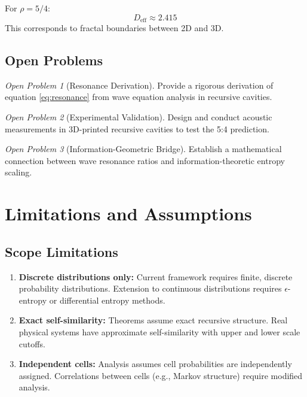 \documentclass[11pt,a4paper]{article}
\theoremstyle{definition}
\theoremstyle{remark}
\newtheorem{openproblem}{Open Problem}
\newcommand{\Deff}{D_{\mathrm{eff}}}
\begin{document}
For $\rho = 5/4$:
\begin{equation}
    \Deff \approx 2.415
\end{equation}
This corresponds to fractal boundaries between 2D and 3D.

\subsection{Open Problems}

\begin{openproblem}[Resonance Derivation]
Provide a rigorous derivation of equation \eqref{eq:resonance} from wave equation analysis in recursive cavities.
\end{openproblem}

\begin{openproblem}[Experimental Validation]
Design and conduct acoustic measurements in 3D-printed recursive cavities to test the 5:4 prediction.
\end{openproblem}

\begin{openproblem}[Information-Geometric Bridge]
Establish a mathematical connection between wave resonance ratios and information-theoretic entropy scaling.
\end{openproblem}

\section{Limitations and Assumptions}
\label{sec:limitations}

\subsection{Scope Limitations}

\begin{enumerate}
    \item \textbf{Discrete distributions only:} Current framework requires finite, discrete probability distributions. Extension to continuous distributions requires $\epsilon$-entropy or differential entropy methods.
    
    \item \textbf{Exact self-similarity:} Theorems assume exact recursive structure. Real physical systems have approximate self-similarity with upper and lower scale cutoffs.
    
    \item \textbf{Independent cells:} Analysis assumes cell probabilities are independently assigned. Correlations between cells (e.g., Markov structure) require modified analysis.
\end{enumerate}
\end{document}
